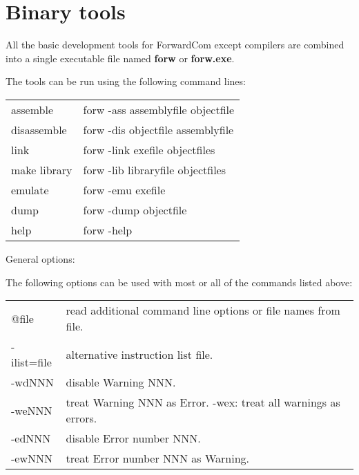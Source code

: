\documentclass[forwardcom.tex]{subfiles}
\begin{document}
\RaggedRight
\lstset{language=C}            %
\lstset{basicstyle=\ttfamily,breaklines=true}


\chapter{Binary tools} \label{chap:binTools}
All the basic development tools for ForwardCom except compilers are combined into a single executable file named \textbf{forw} or \textbf{forw.exe}.
\vspace{2mm}

The tools can be run using the following command lines:
\vspace{2mm}

\label{bintoolCommands}
\begin{tabular}{ll}
\hline
assemble & forw -ass assemblyfile objectfile \\ 
disassemble & forw -dis objectfile assemblyfile \\ 
link & forw -link exefile objectfiles \\ 
make library & forw -lib libraryfile objectfiles \\
emulate & forw -emu exefile \\ 
dump & forw -dump objectfile \\ 
help & forw -help \\ 
\hline
\end{tabular}
\vspace{4mm}

General options:

The following options can be used with most or all of the commands listed above:

\begin{tabular}{p{20mm}p{140mm}}
\hline
@file & read additional command line options or file names from file.\\
-ilist=file & alternative instruction list file.\\
-wdNNN & disable Warning NNN.\\
-weNNN & treat Warning NNN as Error. -wex: treat all warnings as errors.\\
-edNNN & disable Error number NNN.\\
-ewNNN & treat Error number NNN as Warning.\\
\hline
\end{tabular}
\vspace{2mm}
\end{document}
